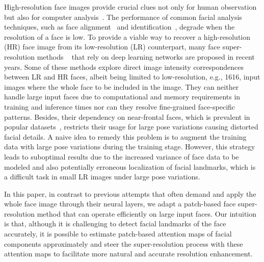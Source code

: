 \documentclass[10pt,twocolumn,letterpaper]{article}
\begin{document}
High-resolution face images provide crucial clues not only for human observation but also for computer analysis~\cite{fasel2003automatic,zhao2003face}. The performance of common facial analysis techniques, such as face alignment~\cite{bulat2017far} and identification~\cite{taigman2014deepface}, degrade when the resolution of a face is low. To provide a viable way to recover a high-resolution (HR) face image from its low-resolution (LR) counterpart, many face super-resolution methods ~\cite{Zhou2015,yu2016ultra,yu2017hallucinating,yu2018eccv,zhu2016deep,cao2017attention,dahl2017pixel} that rely on deep learning networks are proposed in recent years. Some of these methods explore direct image intensity correspondences between LR and HR faces, albeit being limited to low-resolution, e.g., 1616, input images where the whole face to be included in the image. They can neither handle large input faces due to computational and memory requirements in training and inference times nor can they resolve fine-grained face-specific patterns. Besides, their dependency on near-frontal faces, which is prevalent in popular datasets~\cite{Liu2015faceattributes,LFWTech}, restricts their usage for large pose variations causing distorted facial details. A naive idea to remedy this problem is to augment the training data with large pose variations during the training stage. However, this strategy leads to suboptimal results due to the increased variance of face data to be modeled and also potentially erroneous localization of facial landmarks, which is a difficult task in small LR images under large pose variations.

In this paper, in contrast to previous attempts that often demand and apply the whole face image through their neural layers, we adapt a patch-based face super-resolution method that can operate efficiently on large input faces. Our intuition is that, although it is challenging to detect facial landmarks of the face accurately, it is possible to estimate patch-based attention maps of facial components approximately and steer the super-resolution process with these attention maps to facilitate more natural and accurate resolution enhancement. 
\end{document}
